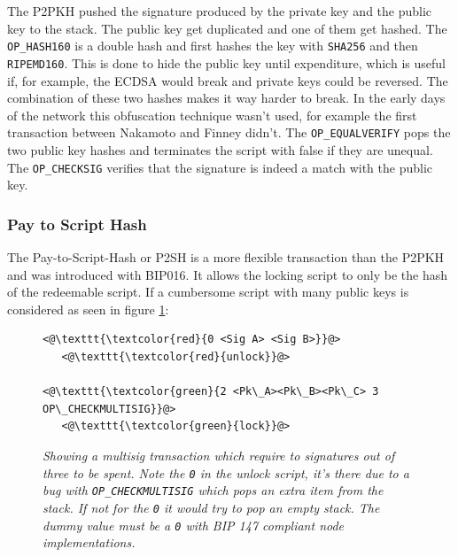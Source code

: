 The P2PKH pushed the signature produced by the private key and the public key to the stack. The public key get duplicated and one of them get hashed. The \texttt{OP\_HASH160} is a double hash and first hashes the key with \texttt{SHA256} and then \texttt{RIPEMD160}. This is done to hide the public key until expenditure, which is useful if, for example, the ECDSA would break and private keys could be reversed. The combination of these two hashes makes it way harder to break. In the early days of the network this obfuscation technique wasn't used, for example the first transaction between Nakamoto and Finney didn't\cite{nakamoto:finney:tx}.
The \texttt{OP\_EQUALVERIFY} pops the two public key hashes and terminates the script with false if they are unequal.
The \texttt{OP\_CHECKSIG} verifies that the signature is indeed a match with the public key. 

\subsubsection{Pay to Script Hash}

The Pay-to-Script-Hash or P2SH is a more flexible transaction than the P2PKH and was introduced with BIP016\cite{bip:0016:p2sh}. It allows the locking script to only be the hash of the redeemable script. If a cumbersome script with many public keys is considered as seen in figure \ref{fig:cumbersome:script}:

\begin{figure}
	
	\begin{lstlisting}
<@\texttt{\textcolor{red}{0 <Sig A> <Sig B>}}@>   
   <@\texttt{\textcolor{red}{unlock}}@>
	
<@\texttt{\textcolor{green}{2 <Pk\_A><Pk\_B><Pk\_C> 3 OP\_CHECKMULTISIG}}@>
   <@\texttt{\textcolor{green}{lock}}@>
	\end{lstlisting}
	
	\caption{\textit{ Showing a multisig transaction which require to signatures out of three to be spent. Note the \texttt{0} in the unlock script, it's there due to a bug with \texttt{OP\_CHECKMULTISIG} which pops an extra item from the stack. If not for the \texttt{0} it would try to pop an empty stack. The dummy value must be a \texttt{0} with BIP 147 compliant node implementations\cite{bip:0147:dummy:zero}.
	}}
	\label{fig:cumbersome:script}
\end{figure} 

